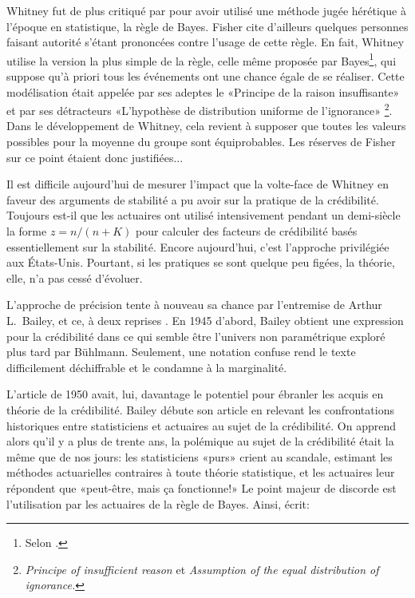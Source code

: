 Whitney fut de plus critiqué par \citet{Fisher:Whitney:discussion:1919}
pour avoir utilisé une méthode jugée hérétique à l'époque en
statistique, la règle de Bayes. Fisher cite d'ailleurs quelques
personnes faisant autorité s'étant prononcées contre l'usage de cette
règle. En fait, Whitney utilise la version la plus simple de la règle,
celle même proposée par Bayes\footnote{%
  Selon \citet{Bailey:1950}.}, %
qui suppose qu'à priori tous les événements ont une chance égale de se
réaliser. Cette modélisation était appelée par ses adeptes le
«Principe de la raison insuffisante» et par ses détracteurs
«L'hypothèse de distribution uniforme de l'ignorance»%
\footnote{\emph{Principe of insufficient reason} et \emph{Assumption
    of the equal distribution of ignorance.}}. %
Dans le développement de Whitney, cela revient à supposer que toutes
les valeurs possibles pour la moyenne du groupe sont équiprobables.
Les réserves de Fisher sur ce point étaient donc justifiées...

Il est difficile aujourd'hui de mesurer l'impact que la volte-face de
Whitney en faveur des arguments de stabilité a pu avoir sur la
pratique de la crédibilité. Toujours est-il que les actuaires ont
utilisé intensivement pendant un demi-siècle la forme $z = n/(n + K)$ pour
calculer des facteurs de crédibilité basés essentiellement sur la
stabilité. Encore aujourd'hui, c'est l'approche privilégiée aux
États-Unis. Pourtant, si les pratiques se sont quelque peu figées, la
théorie, elle, n'a pas cessé d'évoluer.

L'approche de précision tente à nouveau sa chance par l'entremise de
Arthur L.~Bailey, et ce, à deux reprises
\citep{Bailey:1945,Bailey:1950}. En 1945 d'abord, Bailey obtient une
expression pour la crédibilité dans ce qui semble être l'univers non
paramétrique exploré plus tard par Bühlmann. Seulement, une notation
confuse rend le texte difficilement déchiffrable et le condamne à la
marginalité.

L'article de 1950 avait, lui, davantage le potentiel pour ébranler les
acquis en théorie de la crédibilité. Bailey débute son article en
relevant les confrontations historiques entre statisticiens et
actuaires au sujet de la crédibilité. On apprend alors qu'il y a plus
de trente ans, la polémique au sujet de la crédibilité était la même
que de nos jours: les statisticiens «purs» crient au scandale,
estimant les méthodes actuarielles contraires à toute théorie
statistique, et les actuaires leur répondent que «peut-être, mais ça
fonctionne!» Le point majeur de discorde est l'utilisation par les
actuaires de la règle de Bayes. Ainsi, \citet{Bailey:1950} écrit:

